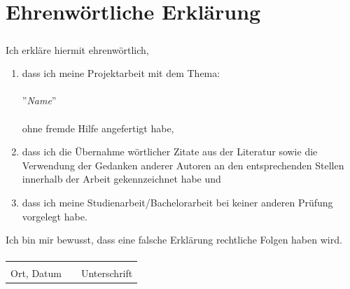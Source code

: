 \documentclass[12pt,a4paper]{scrartcl}
\begin{document}
	\section{Ehrenwörtliche Erklärung}
\begin{align*}
\textbf{}
\end{align*}
Ich erkläre hiermit ehrenwörtlich,\\
\begin{enumerate}
\item[1.]dass ich meine Projektarbeit mit dem Thema:\\
\\
''\textit{Name}''\\
\\
ohne fremde Hilfe angefertigt habe,
\item[2.]dass ich die Übernahme wörtlicher Zitate aus der Literatur sowie die Verwendung der Gedanken anderer Autoren an den entsprechenden Stellen innerhalb der Arbeit gekennzeichnet habe und
\item[3.]dass ich meine Studienarbeit/Bachelorarbeit bei keiner anderen Prüfung vorgelegt habe.
\end{enumerate}
Ich bin mir bewusst, dass eine falsche Erklärung rechtliche Folgen haben wird.\\
\begin{align*}
\textbf{}
\end{align*}
\begin{tabular}{lp{2em}l}
 \hspace{5cm}   && \hspace{4cm} \\\cline{1-1}\cline{3-3}
 Ort, Datum     && Unterschrift
\end{tabular}
\end{document}
